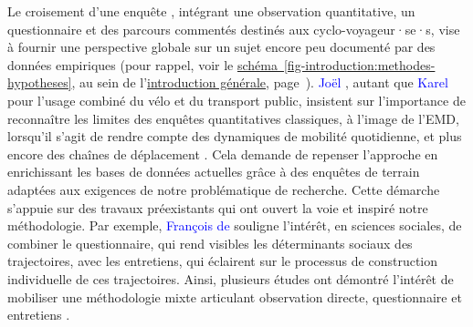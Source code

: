 \begin{refsegment}
Le croisement d’une enquête , intégrant une observation quantitative, un questionnaire et des parcours commentés destinés aux cyclo-voyageur·se·s, vise à fournir une perspective globale sur un sujet encore peu documenté par des données empiriques (pour rappel, voir le \hyperref[fig-introduction:methodes-hypotheses]{schéma~\ref{fig-introduction:methodes-hypotheses}}, au sein de l'\hyperref[introduction-generale:methodologie]{introduction générale}, page~\pageref{fig-introduction:methodes-hypotheses}). \textcolor{blue}{Joël} \textcolor{blue}{\textcite[24]{meissonnier_pour_2012}}, autant que \textcolor{blue}{Karel} \textcolor{blue}{\textcite[291]{martens_bicycle_2004}} pour l'usage combiné du \gls{vélo} et du transport public, insistent sur l’importance de reconnaître les limites des enquêtes quantitatives classiques, à l'image de l’\acrfull{EMD}, lorsqu’il s’agit de rendre compte des dynamiques de mobilité quotidienne, et plus encore des chaînes de déplacement \textcolor{blue}{\autocite[10]{kieffer_chainage_2011}}. Cela demande de repenser l'approche en enrichissant les bases de données actuelles grâce à des enquêtes de terrain adaptées aux exigences de notre problématique de recherche. Cette démarche s’appuie sur des travaux préexistants qui ont ouvert la voie et inspiré notre méthodologie. Par exemple, \textcolor{blue}{François de} \textcolor{blue}{\textcite[42]{singly_questionnaire_2016}} souligne l’intérêt, en sciences sociales, de combiner le questionnaire, qui rend visibles les déterminants sociaux des trajectoires, avec les entretiens, qui éclairent sur le processus de construction individuelle de ces trajectoires. Ainsi, plusieurs études ont démontré l’intérêt de mobiliser une méthodologie mixte articulant observation directe, questionnaire et entretiens  \textcolor{blue}{\autocites[258]{greene_toward_1989}[120]{bergeron_uncovering_2014}[3]{despres_replacer_2019}}.%


\end{refsegment}

